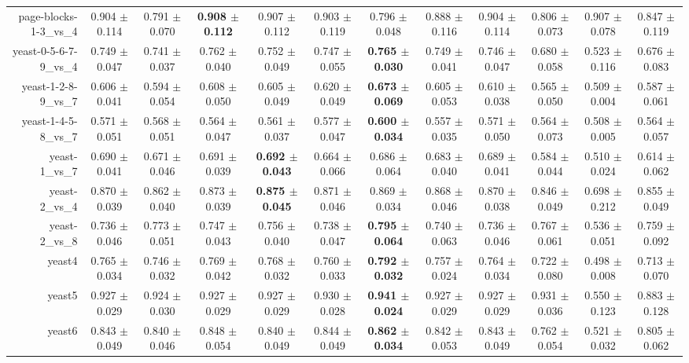 \begin{table}[!ht]
{\begin{tabular}{r c c c c c c c c c c c}
page-blocks-1-3\_vs\_4 & 0.904 $\pm$ 0.114 & 0.791 $\pm$ 0.070 & \textbf{0.908 $\pm$ 0.112} & 0.907 $\pm$ 0.112 & 0.903 $\pm$ 0.119 & 0.796 $\pm$ 0.048 & 0.888 $\pm$ 0.116 & 0.904 $\pm$ 0.114 & 0.806 $\pm$ 0.073 & 0.907 $\pm$ 0.078 & 0.847 $\pm$ 0.119 \\
yeast-0-5-6-7-9\_vs\_4 & 0.749 $\pm$ 0.047 & 0.741 $\pm$ 0.037 & 0.762 $\pm$ 0.040 & 0.752 $\pm$ 0.049 & 0.747 $\pm$ 0.055 & \textbf{0.765 $\pm$ 0.030} & 0.749 $\pm$ 0.041 & 0.746 $\pm$ 0.047 & 0.680 $\pm$ 0.058 & 0.523 $\pm$ 0.116 & 0.676 $\pm$ 0.083 \\
yeast-1-2-8-9\_vs\_7 & 0.606 $\pm$ 0.041 & 0.594 $\pm$ 0.054 & 0.608 $\pm$ 0.050 & 0.605 $\pm$ 0.049 & 0.620 $\pm$ 0.049 & \textbf{0.673 $\pm$ 0.069} & 0.605 $\pm$ 0.053 & 0.610 $\pm$ 0.038 & 0.565 $\pm$ 0.050 & 0.509 $\pm$ 0.004 & 0.587 $\pm$ 0.061 \\
yeast-1-4-5-8\_vs\_7 & 0.571 $\pm$ 0.051 & 0.568 $\pm$ 0.051 & 0.564 $\pm$ 0.047 & 0.561 $\pm$ 0.037 & 0.577 $\pm$ 0.047 & \textbf{0.600 $\pm$ 0.034} & 0.557 $\pm$ 0.035 & 0.571 $\pm$ 0.050 & 0.564 $\pm$ 0.073 & 0.508 $\pm$ 0.005 & 0.564 $\pm$ 0.057 \\
yeast-1\_vs\_7 & 0.690 $\pm$ 0.041 & 0.671 $\pm$ 0.046 & 0.691 $\pm$ 0.039 & \textbf{0.692 $\pm$ 0.043} & 0.664 $\pm$ 0.066 & 0.686 $\pm$ 0.064 & 0.683 $\pm$ 0.040 & 0.689 $\pm$ 0.041 & 0.584 $\pm$ 0.044 & 0.510 $\pm$ 0.024 & 0.614 $\pm$ 0.062 \\
yeast-2\_vs\_4 & 0.870 $\pm$ 0.039 & 0.862 $\pm$ 0.040 & 0.873 $\pm$ 0.039 & \textbf{0.875 $\pm$ 0.045} & 0.871 $\pm$ 0.046 & 0.869 $\pm$ 0.034 & 0.868 $\pm$ 0.046 & 0.870 $\pm$ 0.038 & 0.846 $\pm$ 0.049 & 0.698 $\pm$ 0.212 & 0.855 $\pm$ 0.049 \\
yeast-2\_vs\_8 & 0.736 $\pm$ 0.046 & 0.773 $\pm$ 0.051 & 0.747 $\pm$ 0.043 & 0.756 $\pm$ 0.040 & 0.738 $\pm$ 0.047 & \textbf{0.795 $\pm$ 0.064} & 0.740 $\pm$ 0.063 & 0.736 $\pm$ 0.046 & 0.767 $\pm$ 0.061 & 0.536 $\pm$ 0.051 & 0.759 $\pm$ 0.092 \\
yeast4 & 0.765 $\pm$ 0.034 & 0.746 $\pm$ 0.032 & 0.769 $\pm$ 0.042 & 0.768 $\pm$ 0.032 & 0.760 $\pm$ 0.033 & \textbf{0.792 $\pm$ 0.032} & 0.757 $\pm$ 0.024 & 0.764 $\pm$ 0.034 & 0.722 $\pm$ 0.080 & 0.498 $\pm$ 0.008 & 0.713 $\pm$ 0.070 \\
yeast5 & 0.927 $\pm$ 0.029 & 0.924 $\pm$ 0.030 & 0.927 $\pm$ 0.029 & 0.927 $\pm$ 0.029 & 0.930 $\pm$ 0.028 & \textbf{0.941 $\pm$ 0.024} & 0.927 $\pm$ 0.029 & 0.927 $\pm$ 0.029 & 0.931 $\pm$ 0.036 & 0.550 $\pm$ 0.123 & 0.883 $\pm$ 0.128 \\
yeast6 & 0.843 $\pm$ 0.049 & 0.840 $\pm$ 0.046 & 0.848 $\pm$ 0.054 & 0.840 $\pm$ 0.049 & 0.844 $\pm$ 0.049 & \textbf{0.862 $\pm$ 0.034} & 0.842 $\pm$ 0.053 & 0.843 $\pm$ 0.049 & 0.762 $\pm$ 0.054 & 0.521 $\pm$ 0.032 & 0.805 $\pm$ 0.062 \\

\end{tabular}}
\end{table}
